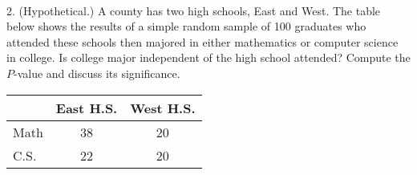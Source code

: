 \documentclass[10pt]{article}
\begin{document}
\eject
{\ }

2. (Hypothetical.)  A county has two high schools, East and West.  
The table below shows the results of a simple random sample of 100 graduates
who attended  these schools then majored in either mathematics or computer science in 
college.  Is  college major independent of the high school attended?
Compute the $P$-value and discuss its significance.

\begin{center}
\begin{tabular}{|l|cc|}\hline
     & East H.S. & West H.S.\vphantom{\Large Y}\\\hline
Math & 38 & 20\vphantom{\Large Y}\\
C.S. & 22 & 20 \\\hline
\end{tabular}
\end{center}
\vfill
\eject
\end{document}
